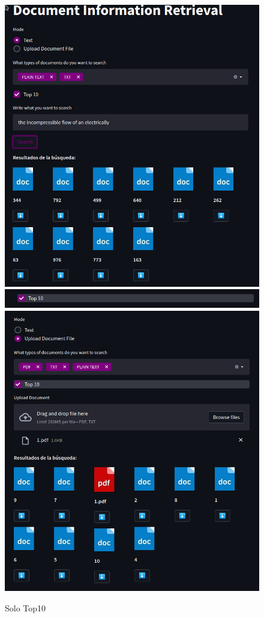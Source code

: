 \documentclass{llncs}
\begin{document}
\begin{figure}
    \caption{Solo Top10}
    \includegraphics[scale = .28]{./images/top_10_sear.png}
    \includegraphics[scale = .28]{./images/top_10.png}
    \includegraphics[scale = .28]{./images/top10_2.png}
\end{figure}
\end{document}
